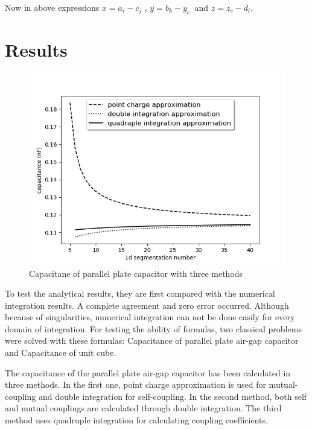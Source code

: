 \documentclass[final,5p,times,twocolumn]{elsarticle}
\begin{document}
Now in above expressions $x = a_i - c_j$ , $y = b_k - y_c\ $ and $z = z_c - d_l$.
\section{Results}
\begin {figure}[h]
	\center
	\includegraphics[width=\linewidth]	{saeedvshitoshiandzho.png}
	\caption{Capacitane of parallel plate capacitor with three  methods}
\end{figure}
To test the analytical results, they are first compared with the numerical integration results. A complete agreement and zero error occurred. Although because of singularities, numerical integration can not be done easily for every domain of integration. For testing the ability of formulas, two classical problems were solved with these formulas: Capacitance of parallel plate air-gap capacitor and Capacitance of unit cube.



The capacitance of the parallel plate air-gap capacitor has been calculated in three methods. In the first one, point charge approximation is used for mutual-coupling and double integration for self-coupling. In the second method, both self and mutual couplings are calculated through double integration. The third method uses quadruple integration for calculating coupling coefficients. 
\end{document}

